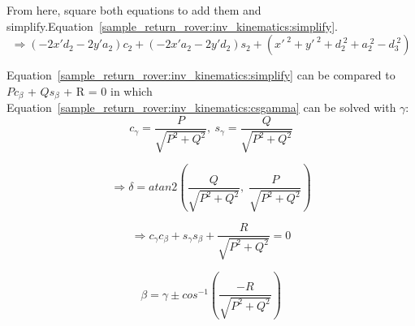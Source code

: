From here, square both equations to add them and simplify.Equation~\ref{sample_return_rover:inv_kinematics:simplify}.
\begin{equation}
	\Rightarrow (-2x'd_{2}-2y'a_{2})c_{2}+(-2x'a_{2}-2y'd_{2})s_{2}+(x'^{\;2}+y'^{\;2}+d_{2}^{\;2}+a_{2}^{\;2}-d_{3}^{\; 2})
\label{sample_return_rover:inv_kinematics:simplify}
\end{equation}

Equation~\ref{sample_return_rover:inv_kinematics:simplify} can be compared to $Pc_{\beta}$ + $Qs_{\beta}$ + R = 0 in which Equation~\ref{sample_return_rover:inv_kinematics:csgamma}  can be solved with $\gamma$:
\begin{equation}
	c_{\gamma} = \frac{P}{\sqrt{P^{2} + Q^{2}}} ,\:
	s_{\gamma} = \frac{Q}{\sqrt{P^{2} + Q^{2}}}
	\label{sample_return_rover:inv_kinematics:csgamma}
\end{equation}

\begin{equation} \nonumber
\Rightarrow \delta = atan2(\frac{Q}{\sqrt{P^{2} + Q^{2}}},\; \frac{P}{\sqrt{P^{2} + Q^{2}}} )	
\end{equation}

\begin{equation} \nonumber
	\Rightarrow c_{\gamma}c_{\beta} + s_{\gamma}s_{\beta} +  \frac{R}{\sqrt{P^{2} + Q^{2}}} = 0
\end{equation}

\begin{equation}
	\beta = \gamma \pm cos^{-1} (\frac{-R}{\sqrt{P^{2} + Q^{2}}})
	\label{sample_return_rover:inv_kinematics:beta}
\end{equation}

